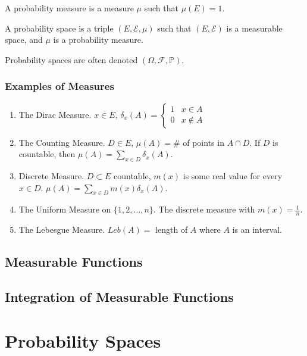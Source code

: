 \documentclass[12pt, titlepage]{article}
\begin{document}
\begin{dfn}{}
	A probability measure is a measure $\mu$ such that $\mu(E) = 1$.
\end{dfn}

\begin{dfn}
	A probability space is a triple $(E, \mathcal{E}, \mu)$ such that $(E, \mathcal{E})$ is a measurable space, and $\mu$ is a probability measure.
\end{dfn}

Probability spaces are often denoted $(\Omega, \mathcal{F}, \mathbb{P})$.\\

\subsubsection{Examples of Measures}
\begin{enumerate}
	\item The Dirac Measure. $x \in E$, $\delta_x(A) =
	\begin{cases}
	1 & x \in A\\
	0 & x \not \in A
	\end{cases}$
	\item The Counting Measure. $D \in E$, $\mu(A) = $\# of points in $A \cap D$. If $D$ is countable, then $\mu(A) = \sum_{x \in D} \delta_x(A)$.
	\item Discrete Measure. $D \subset E$ countable, $m(x)$ is some real value for every $x \in D$. $\mu(A) = \sum_{x \in D} m(x)\delta_x(A)$.
	\item The Uniform Measure on $\{1, 2, \dots, n\}$. The discrete measure with $m(x) = \frac{1}{n}$.
	\item The Lebesgue Measure. $Leb(A) =$ length of $A$ where $A$ is an interval.
\end{enumerate}


\subsection{Measurable Functions}

\subsection{Integration of Measurable Functions}

\section{Probability Spaces}
\end{document}
